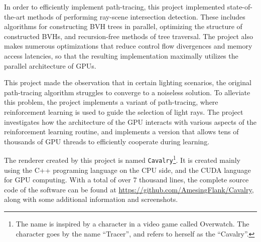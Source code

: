 In order to efficiently implement path-tracing, this project implemented state-of-the-art methods of performing ray-scene intersection detection. These includes algorithms for constructing BVH trees in parallel, optimizing the structure of constructed BVHs, and recursion-free methods of tree traversal. The project also makes numerous optimizations that reduce control flow divergences and memory access latencies, so that the resulting implementation maximally utilizes the parallel architecture of GPUs.  

This project made the observation that in certain lighting scenarios, the original path-tracing algorithm struggles to converge to a noiseless solution. To alleviate this problem, the project implements a variant of path-tracing, where reinforcement learning is used to guide the selection of light rays. The project investigates how the architecture of the GPU interacts with various aspects of the reinforcement learning routine, and implements a version that allows tens of thousands of GPU threads to efficiently cooperate during learning. 


The renderer created by this project is named \texttt{Cavalry}\footnote{The name is inspired by a character in a video game called Overwatch. The character goes by the name ``Tracer'', and refers to herself as the ``Cavalry''.}. It is created mainly using the C++ programing language on the CPU side, and the CUDA language for GPU computing. With a total of over 7 thousand lines, the complete source code of the software can be found at \url{https://github.com/AmesingFlank/Cavalry}, along with some additional information and screenshots.
